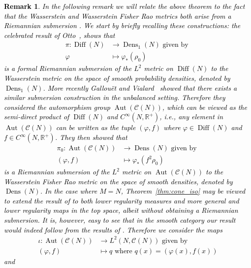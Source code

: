 \documentclass[final,hidelinks,onefignum,onetabnum]{siamart220329}
\newtheorem{remark}{Remark}
\newcommand{\R}{\mathbb{R}}
\newcommand{\Diff}{\operatorname{Diff}}
\begin{document}
\textcolor{black}{\begin{remark}\label{rem:RelationToCH} In the following remark we will relate the above theorem to the fact that the Wasserstein and Wasserstein Fisher Rao metrics both arise from a Riemannian submersion \cite{OttoPic,GALLOUET20184199}.  We start by briefly recalling these constructions: the celebrated result of Otto~\cite{OttoPic}, shows that \begin{align*} \pi: \Diff(N) & \to \operatorname{Dens}_1(N) \text{ given by } \\ \varphi & \mapsto \varphi_*(\rho_0)
\end{align*} is a formal Riemannian submersion of the $L^2$ metric on $\Diff(N)$ to the Wasserstein metric on the space of smooth probability densities, denoted by $\operatorname{Dens}_1(N)$.  More recently Gallou\"{e}t and Vialard~\cite{GALLOUET20184199} showed that there exists a similar submersion construction in the unbalanced setting. Therefore they considered the automorphism group
$\operatorname{Aut}(\mathcal{C}(N))$, which can be viewed as the semi-direct product of $\Diff(N)$ and $C^\infty(N,\R^+)$, i.e., any element in $\operatorname{Aut}(\mathcal{C}(N))$ can be written as the tuple $(\varphi, f)$ where $\varphi\in\Diff(N)$ and $f\in C^\infty(N,\R^+)$. They then showed that
\begin{align*} \pi_0: \operatorname{Aut}(\mathcal{C}(N)) & \to \operatorname{Dens}(N) \text{ given by } \\ (\varphi,f) & \mapsto \varphi_*(f^2\rho_0)
\end{align*}  is a Riemannian submersion of the $L^2$ metric on $\operatorname{Aut}(\mathcal{C}(N))$ to the Wasserstein Fisher Rao metric on the space of smooth densities, denoted by $\operatorname{Dens}(N)$. In the case where $M=N$, Theorem~\ref{thm:cone_iso} may be viewed to extend the result of \cite{GALLOUET20184199} to both lower regularity measures and more general and lower regularity maps in the top space, albeit without obtaining a Riemannian submersion.  It is, however, easy to see that in the smooth category our result would indeed follow from the results of \cite{GALLOUET20184199}. Therefore we consider the maps
\begin{align*}
    \iota: \operatorname{Aut}(\mathcal{C}(N)) &\to L^2(N,\mathcal{C}(N)) \text{ given by }\\
    (\varphi,f)&\mapsto q \text{ where } q(x)=(\varphi(x),f(x))
\end{align*}
and 
\begin{align*}

\end{align*}
\end{remark}}
\end{document}
